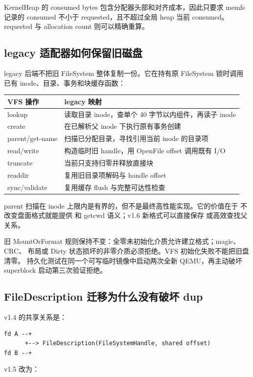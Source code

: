 KernelHeap 的 consumed bytes 包含分配器头部和对齐成本，因此只要求 memfs
记录的 consumed 不小于 requested，且不超过全局 heap 当前 consumed。
requested 与 allocation count 则可以精确重算。

\subsection{legacy 适配器如何保留旧磁盘}

legacy 后端不把旧 FileSystem 整体复制一份。它在持有原 FileSystem 锁时调用
已有 inode、目录、事务和块缓存函数：

\begin{longtable}{L{0.28\textwidth}L{0.60\textwidth}}
\toprule
VFS 操作 & legacy 映射\\
\midrule
lookup & 读取目录 inode，查单个 40 字节以内组件，再读子 inode\\
create & 在已解析父 inode 下执行原有事务创建\\
parent/get-name & 扫描已分配目录，寻找引用当前 inode 的目录项\\
read/write & 构造临时旧 handle，用 OpenFile offset 调用既有 I/O\\
truncate & 当前只支持归零并释放直接块\\
readdir & 复用旧目录项解码与 handle offset\\
sync/validate & 复用缓存 flush 与完整可达性检查\\
\bottomrule
\end{longtable}

parent 扫描在 inode 上限内是有界的，但不是最终高性能实现。它的价值在于
不改变盘面格式就能提供  和 getcwd 语义；v1.6 新格式可以直接保存
或高效查找父关系。

旧 MountOrFormat 规则保持不变：全零未初始化介质允许建立格式；magic、CRC、
布局或 Dirty 状态损坏的非零介质必须拒绝。VFS 初始化失败不能把旧盘清零。
持久化测试在同一个可写临时镜像中启动两次全新 QEMU，再主动破坏 superblock
启动第三次验证拒绝。

\subsection{FileDescription 迁移为什么没有破坏 dup}

v1.4 的共享关系是：

\begin{lstlisting}
fd A --+
      +--> FileDescription(FileSystemHandle, shared offset)
fd B --+
\end{lstlisting}

v1.5 改为：

